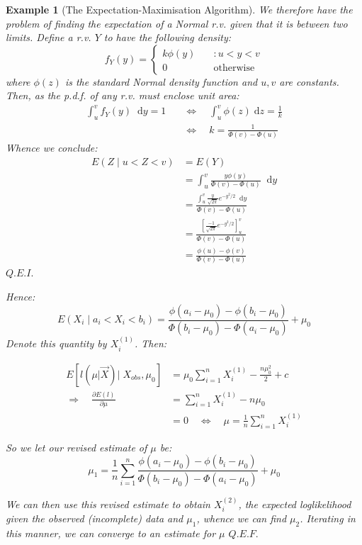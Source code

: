 \documentclass[12pt,a4paper]{article}
\newcommand{\diff}{\;\mathrm{d}}
\newtheorem{ex}[thm]{Example}
\begin{document}
\begin{ex}[The Expectation-Maximisation Algorithm]
We therefore have the problem of finding the expectation of a Normal r.v. given that it is between two limits. Define a r.v. $Y$ to have the following density:
$$f_Y(y) = \left\{ \begin{array}{cl} k\phi(y)\quad& : u<y<v\\ 0 \quad& \mbox{otherwise}\end{array}\right.$$
where $\phi(z)$ is the standard Normal density function and $u,v$ are constants. Then, as the p.d.f. of any r.v. must enclose unit area:
\begin{align*}
\int_u^v\!\! f_Y(y)\;\diff y = 1 \quad &\Leftrightarrow\quad \int_u^v \!\! \phi(z) \diff z = \frac{1}{k}\\
&\Leftrightarrow\quad k = \frac{1}{\Phi(v) - \Phi(u)}
\end{align*}
Whence we conclude:
\begin{align*}
E(Z \mid u<Z<v) &= E(Y)\\
&= \int_u^v \!\! \frac{y\phi(y)}{\Phi(v)-\Phi(u)}\;\diff y\\
&= \frac{\int_u^v \!\! \frac{y}{\sqrt{2\pi}} e^{-y^2/2}\;\diff y}{\Phi(v)-\Phi(u)}\\
&= \frac{\left[\frac{-1}{\sqrt{2\pi}}e^{-y^2/2}\right]_u^v}{\Phi(v)-\Phi(u)}\\
&= \frac{\phi(u)-\phi(v)}{\Phi(v)-\Phi(u)}
\end{align*}\hfill$Q.E.I.$

\noindent Hence:
$$E(X_i \mid a_i< X_i<b_i) = \frac{\phi(a_i-\mu_0)-\phi(b_i-\mu_0)}{\Phi(b_i-\mu_0)-\Phi(a_i-\mu_0)}+\mu_0$$
Denote this quantity by $X_i^{(1)}$. Then:

\begin{align*}
E\left[l\left(\mu | \vec{X}\right) \bigg| \; X_{obs},\mu_0\right] &= \mu_0 \sum_{i=1}^n X_i^{(1)} - \frac{n\mu_0^2}{2} + c\\
\Rightarrow\quad \frac{\partial E(l)}{\partial \mu} &= \sum_{i=1}^n X_i^{(1)} - n\mu_0\\
&= 0 \quad\Leftrightarrow\quad \mu = \frac{1}{n}\sum_{i=1}^n X_i^{(1)}
\end{align*}

So we let our revised estimate of $\mu$ be:
$$\mu_1 = \frac{1}{n} \sum_{i=1}^n \frac{\phi(a_i-\mu_0)-\phi(b_i-\mu_0)}{\Phi(b_i-\mu_0)-\Phi(a_i-\mu_0)}+\mu_0$$

We can then use this revised estimate to obtain $X_i^{(2)}$, the expected loglikelihood given the observed (incomplete) data and $\mu_1$, whence we can find $\mu_2$. Iterating in this manner, we can converge to an estimate for $\mu$ \hfill$Q.E.F.$

\end{ex}
\end{document}
